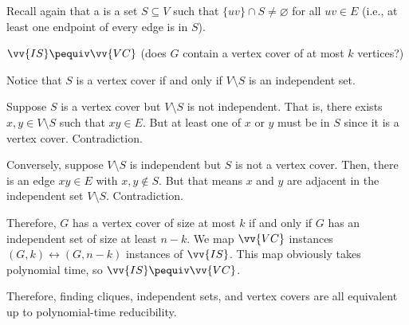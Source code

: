 Recall again that a  is a set $S \subseteq V$
such that $\{uv\} \cap S \neq \varnothing$ for all $uv \in E$
(i.e., at least one endpoint of every edge is in $S$).

\begin{prop}
  $\vv{IS} \pequiv \vv{VC}$ (does $G$ contain a vertex cover of at most $k$ vertices?)
\end{prop}
\begin{prf}
  Notice that $S$ is a vertex cover if and only if $V \setminus S$ is an independent set.

  Suppose $S$ is a vertex cover but $V \setminus S$ is not independent.
  That is, there exists $x,y \in V \setminus S$ such that $xy \in E$.
  But at least one of $x$ or $y$ must be in $S$ since it is a vertex cover.
  Contradiction.

  Conversely, suppose $V \setminus S$ is independent but $S$ is not a vertex cover.
  Then, there is an edge $xy \in E$ with $x, y \not\in S$.
  But that means $x$ and $y$ are adjacent in the independent set $V \setminus S$.
  Contradiction.

  Therefore, $G$ has a vertex cover of size at most $k$ if and only if
  $G$ has an independent set of size at least $n-k$.
  We map $\vv{VC}$ instances $(G,k) \leftrightarrow (G,n-k)$ instances of $\vv{IS}$.
  This map obviously takes polynomial time, so $\vv{IS} \pequiv \vv{VC}$.
\end{prf}

Therefore, finding cliques, independent sets, and vertex covers are all equivalent
up to polynomial-time reducibility.


